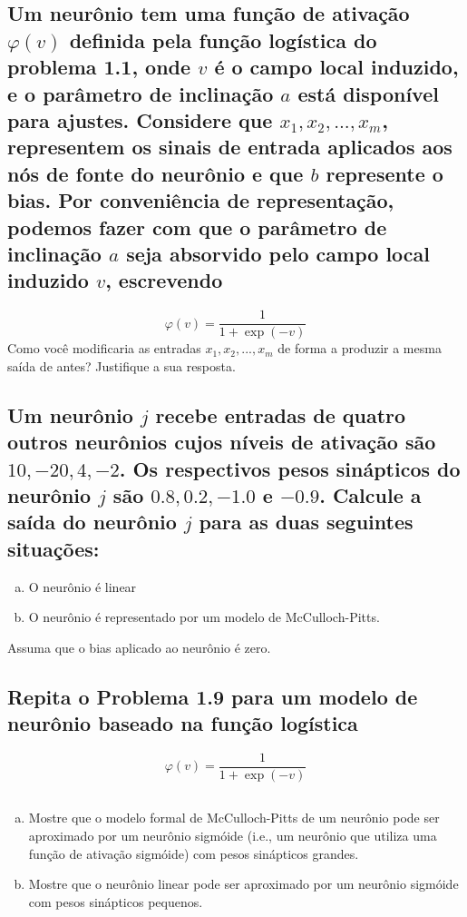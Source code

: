 \documentclass[12pt, openright, a4paper, twoside, english, brazil]{article}
\begin{document}
\subsection{Um neurônio tem uma função de ativação $\varphi(v)$
definida pela função logística do problema 1.1, onde $v$ é o campo
local induzido, e o parâmetro de inclinação $a$ está disponível para
ajustes. Considere que $x_1,x_2,...,x_m$, representem os sinais de
entrada aplicados aos nós de fonte do neurônio e que $b$ represente o
bias. Por conveniência de representação, podemos fazer com que o
parâmetro de inclinação $a$ seja absorvido pelo campo local induzido
$v$, escrevendo}
$$
\varphi(v)=\frac1{1+\exp(-v)}
$$
Como você modificaria as entradas $x_1,x_2,...,x_m$ de forma a
produzir a mesma saída de antes? Justifique a sua resposta.

\subsection{Um neurônio $j$ recebe entradas de quatro outros
neurônios cujos níveis de ativação são $10, -20,4,-2$. Os respectivos
pesos sinápticos do neurônio $j$ são $0.8, 0.2, -1.0$ e $-0.9$.
Calcule a saída do neurônio $j$ para as duas seguintes situações:}
\begin{enumerate}[(a)]
\item O neurônio é linear
\item O neurônio é representado por um modelo de McCulloch-Pitts.
\end{enumerate}
Assuma que o bias aplicado ao neurônio é zero.

\subsection{Repita o Problema 1.9 para um modelo de neurônio baseado
na função logística}
$$
\varphi(v)=\frac 1{1+\exp(-v)}
$$

\subsection{}
\begin{enumerate}[(a)]
\item Mostre que o modelo formal de McCulloch-Pitts de um neurônio
  pode ser aproximado por um neurônio sigmóide (i.e., um neurônio que
  utiliza uma função de ativação sigmóide) com pesos sinápticos grandes.
\item Mostre que o neurônio linear pode ser aproximado por um
  neurônio sigmóide com pesos sinápticos pequenos.
\end{enumerate}
\end{document}
